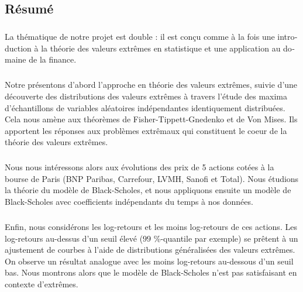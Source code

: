 \begin{otherlanguage}{french}
\cleardoublepage
\chapter*{Résumé}
\bigskip
\paragraph{}
La thématique de notre projet est double : il est con\c cu comme à la fois une introduction à la théorie des valeurs extrêmes en statistique et une application au domaine de la finance.
\paragraph{}
Notre présentons d'abord l'approche en théorie des valeurs extrêmes, suivie d'une découverte des distributions des valeurs extrêmes à travers l'étude des maxima d'échantillons de variables aléatoires indépendantes identiquement distribuées. Cela nous amène aux théorèmes de Fisher-Tippett-Gnedenko et de Von Mises. Ils apportent les réponses aux problèmes extrêmaux qui constituent le coeur de la théorie des valeurs extrêmes.
\paragraph{}
Nous nous intéressons alors aux évolutions des prix de 5 actions cotées à la bourse de Paris (BNP Paribas, Carrefour, LVMH, Sanofi et Total). Nous étudions la théorie du modèle de Black-Scholes, et nous appliquons ensuite un modèle de Black-Scholes avec coefficients indépendants du temps à nos données. 
\paragraph{}
Enfin, nous considérons les log-retours et les moins log-retours de ces actions. Les log-retours au-dessus d'un seuil élevé ($99$ \%-quantile par exemple) se prêtent à un ajustement de courbes à l'aide de distributions généralisées des valeurs extrêmes. On observe un résultat analogue avec les moins log-retours au-dessous d'un seuil bas. Nous montrons alors que le modèle de Black-Scholes n'est pas satisfaisant en contexte d'extrêmes.
\vskip0.5cm
\end{otherlanguage}


